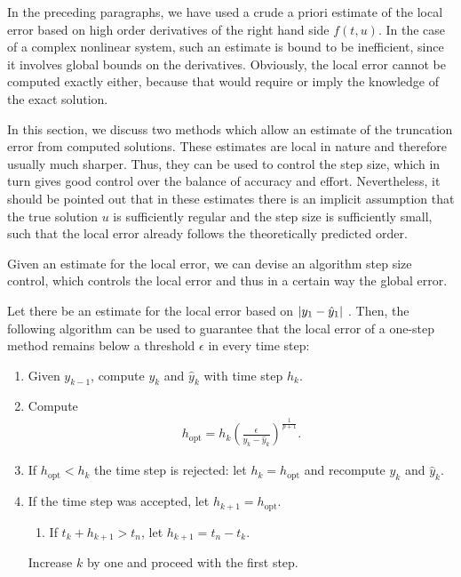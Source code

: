 \begin{intro}
  In the preceding paragraphs, we have used a crude a priori estimate
  of the local error based on high order derivatives of the right hand
  side $f(t,u)$. In the case of a complex nonlinear system, such an
  estimate is bound to be inefficient, since it involves global bounds
  on the derivatives. Obviously, the local error cannot be computed
  exactly either, because that would require or imply the knowledge of
  the exact solution.

  In this section, we discuss two methods which allow an estimate of
  the truncation error from computed solutions. These estimates are
  local in nature and therefore usually much sharper. Thus, they can
  be used to control the step size, which in turn gives good control
  over the balance of accuracy and effort. Nevertheless, it should be
  pointed out that in these estimates there is an implicit assumption
  that the true solution $u$ is sufficiently regular and the step size
  is sufficiently small, such that the local error already follows
  the theoretically predicted order.

  Given an estimate for the local error, we can devise an algorithm
  step size control, which controls the local error and thus in a
  certain way the global error.
\end{intro}

\begin{algorithm}
  Let there be an estimate for the local error based
  on $\lvert y_1 - \hat y_1\rvert$ . Then, the following algorithm can be used
  to guarantee that the local error of a one-step method remains below
  a threshold $\epsilon$ in every time step:

  \begin{enumerate}
  \item Given $y_{k-1}$, compute $y_k$ and $\hat y_k$ with time step $h_k$.
  \item Compute
    \begin{gather}
      \label{eq:explicit:30}
      h_{\text{opt}} = h_k \left(\frac{\epsilon}{y_k - \hat
          y_k}\right)^{\frac1{p+1}}.
    \end{gather}
  \item If $h_{\text{opt}} < h_k$ the time step is rejected: let
    $h_k = h_{\text{opt}}$ and recompute $y_k$ and $\hat y_k$.
  \item If the time step was accepted, let $h_{k+1} = h_{\text{opt}}$.
    \begin{enumerate}
    \item If $t_k+h_{k+1} > t_n$, let $h_{k+1} = t_n-t_k$.
    \end{enumerate}
    Increase $k$ by one and proceed with the first step.
  \end{enumerate}
\end{algorithm}

